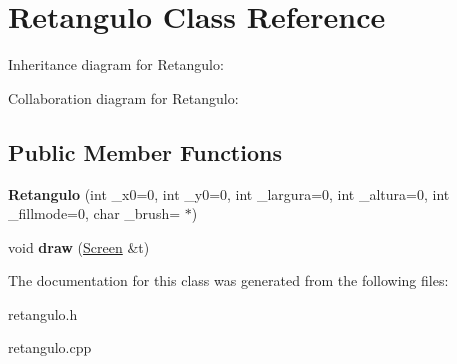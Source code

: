 \hypertarget{class_retangulo}{}\section{Retangulo Class Reference}
\label{class_retangulo}


Inheritance diagram for Retangulo\+:


Collaboration diagram for Retangulo\+:
\subsection*{Public Member Functions}
\begin{DoxyCompactItemize}
\item 
\mbox{\label{class_retangulo_af68a22ea813e94a92dbe8eb050585d3d}} 
{\bfseries Retangulo} (int \+\_\+x0=0, int \+\_\+y0=0, int \+\_\+largura=0, int \+\_\+altura=0, int \+\_\+fillmode=0, char \+\_\+brush=\textquotesingle{} $\ast$\textquotesingle{})
\item 
\mbox{\label{class_retangulo_ac088dd6d3f4f3d3f80363a868c2e74f1}} 
void {\bfseries draw} (\hyperlink{class_screen}{Screen} \&t)
\end{DoxyCompactItemize}


The documentation for this class was generated from the following files\+:\begin{DoxyCompactItemize}
\item 
retangulo.\+h\item 
retangulo.\+cpp\end{DoxyCompactItemize}
